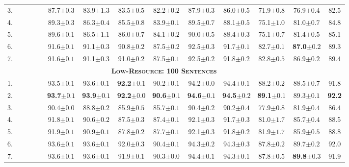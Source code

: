 \documentclass[11pt,a4paper]{article}
\newcommand{\cmark}{\textcolor{blue}{\ding{51}}}
\newcommand{\xmark}{\textcolor{red}{\ding{55}}}
\begin{document}
\begin{table*}[ht]
\begin{tabular}{l|cccc||cccccccc|c}
3. & \cmark & \xmark & \xmark & \xmark & 87.7$\pm0.3$ & 83.9$\pm1.3$ & 83.5$\pm0.5$ & 82.2$\pm0.2$ & 87.9$\pm0.3$ & 86.0$\pm0.5$ & 71.9$\pm0.8$ & 76.9$\pm0.4$ & 82.5 \\
4. & \cmark & \xmark & \cmark & \xmark & 89.3$\pm0.3$ & 86.3$\pm0.4$ & 85.5$\pm0.8$ & 83.9$\pm0.1$ & 89.5$\pm0.7$ & 88.1$\pm0.5$ & 75.1$\pm1.0$ & 81.0$\pm0.7$ & 84.8 \\
5. & \cmark & \xmark & \cmark & \cmark & 89.6$\pm0.1$ & 86.5$\pm1.1$ & 86.0$\pm0.7$ & 84.1$\pm0.2$ & 90.0$\pm0.5$ & 88.4$\pm0.3$ & 75.1$\pm0.7$ & 81.4$\pm0.5$ & 85.1 \\
6. & \cmark & \cmark & \cmark & \xmark & 91.6$\pm0.1$ & 91.1$\pm0.3$ & 90.8$\pm0.2$ & 87.5$\pm0.2$ & 92.5$\pm0.3$ & 91.7$\pm0.1$ & 82.7$\pm0.1$ & \textbf{87.0}$\pm0.2$ & 89.3 \\
7. & \cmark & \cmark & \cmark & \cmark & 91.6$\pm0.1$ & 91.1$\pm0.3$ & 91.0$\pm0.2$ & 87.5$\pm0.1$ & 92.5$\pm0.2$ & 91.8$\pm0.2$ & 82.8$\pm0.5$ & 86.9$\pm0.2$ & 89.4 \\
\hline\hline
\multicolumn{13}{c}{\bf \textsc{Low-Resource: 100 Sentences}}\\
\hline
1. & \xmark & \cmark & \xmark & \xmark & 93.5$\pm0.1$ & 93.6$\pm0.1$ & \textbf{92.2}$\pm0.1$ & 90.2$\pm0.1$ & 94.2$\pm0.0$ & 94.4$\pm0.1$ & 88.2$\pm0.2$ & 88.5$\pm0.7$ & 91.8 \\
2. & \xmark & \cmark & \cmark & \xmark & \textbf{93.7}$\pm0.1$ & \textbf{93.9}$\pm0.1$ & \textbf{92.2}$\pm0.0$ & \textbf{90.6}$\pm0.1$ & \textbf{94.6}$\pm0.1$ & \textbf{94.5}$\pm0.2$ & \textbf{89.1}$\pm0.1$ & 89.3$\pm0.1$ & \textbf{92.2} \\
3. & \cmark & \xmark & \xmark & \xmark & 90.4$\pm0.0$ & 88.8$\pm0.2$ & 85.9$\pm0.5$ & 85.7$\pm0.1$ & 90.4$\pm0.2$ & 90.2$\pm0.4$ & 77.9$\pm0.8$ & 81.9$\pm0.4$ & 86.4 \\
4. & \cmark & \xmark & \cmark & \xmark & 91.8$\pm0.1$ & 90.6$\pm0.2$ & 87.5$\pm0.3$ & 87.4$\pm0.1$ & 92.1$\pm0.3$ & 91.7$\pm0.3$ & 81.0$\pm1.7$ & 85.7$\pm0.4$ & 88.5 \\
5. & \cmark & \xmark & \cmark & \cmark & 91.9$\pm0.1$ & 90.9$\pm0.1$ & 87.8$\pm0.2$ & 87.7$\pm0.1$ & 92.1$\pm0.3$ & 91.8$\pm0.2$ & 81.9$\pm1.7$ & 85.9$\pm0.5$ & 88.8 \\
6. & \cmark & \cmark & \cmark & \xmark & 93.6$\pm0.1$ & 93.6$\pm0.1$ & 92.0$\pm0.3$ & 90.4$\pm0.1$ & 94.3$\pm0.2$ & 94.3$\pm0.3$ & 87.8$\pm0.2$ & 89.7$\pm0.2$ & 92.0 \\
7. & \cmark & \cmark & \cmark & \cmark & 93.6$\pm0.1$ & 93.6$\pm0.1$ & 91.9$\pm0.1$ & 90.3$\pm0.0$ & 94.4$\pm0.1$ & 94.3$\pm0.1$ & 87.8$\pm0.5$ & \textbf{89.8}$\pm0.3$ & 91.9 \\

\end{tabular}
\end{table*}
\end{document}
